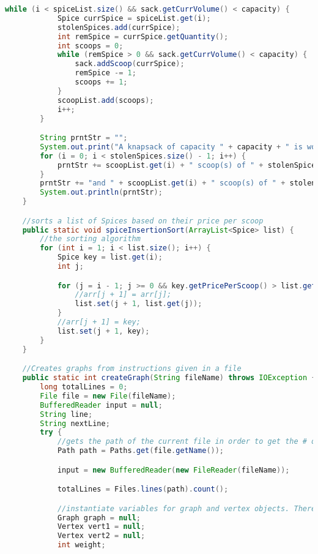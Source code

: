 \documentclass[letterpaper, 10pt,DIV=13]{scrartcl}
\numberwithin{equation}{section} %
\numberwithin{figure}{section} %
\numberwithin{table}{section} %
\begin{document}
\begin{lstlisting}[frame=single, language=java, breaklines]
        while (i < spiceList.size() && sack.getCurrVolume() < capacity) {
            Spice currSpice = spiceList.get(i);
            stolenSpices.add(currSpice);
            int remSpice = currSpice.getQuantity();
            int scoops = 0;
            while (remSpice > 0 && sack.getCurrVolume() < capacity) {
                sack.addScoop(currSpice);
                remSpice -= 1;
                scoops += 1;
            }
            scoopList.add(scoops);
            i++;
        }

        String prntStr = "";
        System.out.print("A knapsack of capacity " + capacity + " is worth " + sack.getValue() + " quatloos and contains ");
        for (i = 0; i < stolenSpices.size() - 1; i++) {
            prntStr += scoopList.get(i) + " scoop(s) of " + stolenSpices.get(i).getName() + ", ";
        }
        prntStr += "and " + scoopList.get(i) + " scoop(s) of " + stolenSpices.get(i).getName() + ".";
        System.out.println(prntStr);
    }

    //sorts a list of Spices based on their price per scoop
    public static void spiceInsertionSort(ArrayList<Spice> list) {
        //the sorting algorithm
        for (int i = 1; i < list.size(); i++) {
            Spice key = list.get(i);
            int j;

            for (j = i - 1; j >= 0 && key.getPricePerScoop() > list.get(j).getPricePerScoop(); j--) {
                //arr[j + 1] = arr[j];
                list.set(j + 1, list.get(j));
            }
            //arr[j + 1] = key;
            list.set(j + 1, key);
        }
    }

    //Creates graphs from instructions given in a file
    public static int createGraph(String fileName) throws IOException {
        long totalLines = 0;
        File file = new File(fileName);
        BufferedReader input = null;
        String line;
        String nextLine;
        try {
            //gets the path of the current file in order to get the # of lines
            Path path = Paths.get(file.getName());

            input = new BufferedReader(new FileReader(fileName)); 

            totalLines = Files.lines(path).count();

            //instantiate variables for graph and vertex objects. There are two Vertex objects in the case of adding edges.
            Graph graph = null;
            Vertex vert1 = null;
            Vertex vert2 = null;
            int weight;


\end{lstlisting}
\end{document}
